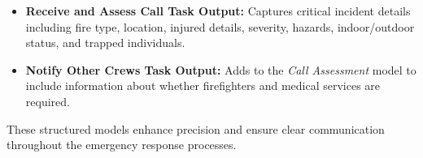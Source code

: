 \begin{itemize}
    \item \textbf{Receive and Assess Call Task Output:} Captures critical incident details including fire type, location, injured details, severity, hazards, indoor/outdoor status, and trapped individuals.
    \item \textbf{Notify Other Crews Task Output:} Adds to the \textit{Call Assessment} model to include information about whether firefighters and medical services are required.
\end{itemize}

These structured models enhance precision and ensure clear communication throughout the emergency response processes.
    